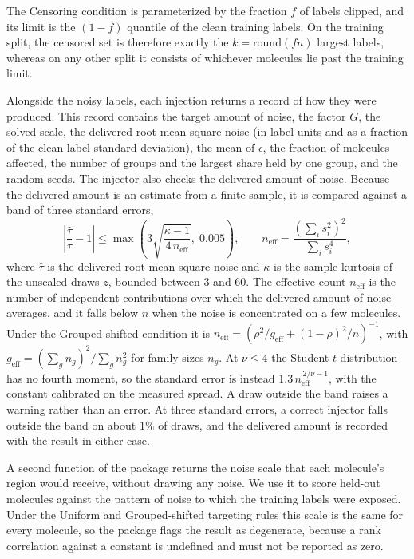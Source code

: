The Censoring condition is parameterized by the fraction $f$ of labels clipped, and its limit is the $(1-f)$ quantile
of the clean training labels. On the training split, the censored
set is therefore exactly the $k = \mathrm{round}(fn)$ largest labels, whereas on any other split it consists of whichever
molecules lie past the training limit.

Alongside the noisy labels, each injection returns a record of how they were produced. This record contains the target amount of noise, the factor
$G$, the solved scale, the delivered root-mean-square noise (in label units and as a fraction of the
clean label standard deviation), the mean of $\epsilon$, the fraction of molecules affected, the
number of groups and the largest share held by one group, and the random seeds. The injector also checks the delivered amount of noise.
Because the delivered amount is an estimate from a finite sample, it is compared against a band of three
standard errors,
\begin{equation}
\left|\frac{\hat{\tau}}{\tau} - 1\right| \le \max\!\left(3\sqrt{\frac{\kappa - 1}{4\,n_{\mathrm{eff}}}},\; 0.005\right),
\qquad
n_{\mathrm{eff}} = \frac{\left(\sum_i s_i^2\right)^2}{\sum_i s_i^4},
\label{eq:dose_tolerance}
\end{equation}
where $\hat{\tau}$ is the delivered root-mean-square noise and $\kappa$ is the sample kurtosis of the
unscaled draws $z$, bounded between 3 and 60. The effective count $n_{\mathrm{eff}}$ is the number of
independent contributions over which the delivered amount of noise averages, and it falls below $n$ when the noise is
concentrated on a few molecules. Under the Grouped-shifted condition it is
$n_{\mathrm{eff}} = \left(\rho^2/g_{\mathrm{eff}} + (1-\rho)^2/n\right)^{-1}$, with
$g_{\mathrm{eff}} = \left(\sum_g n_g\right)^2 / \sum_g n_g^2$ for family sizes $n_g$. At
$\nu \le 4$ the Student-$t$ distribution has no fourth moment, so the standard error is instead
$1.3\,n_{\mathrm{eff}}^{\,2/\nu - 1}$, with the constant calibrated on the measured spread. A draw
outside the band raises a warning rather than an error. At three standard errors, a correct injector
falls outside the band on about $1\%$ of draws, and the delivered amount is recorded with the result
in either case.

A second function of the package returns the noise scale that each molecule's region would receive, without drawing any noise.
We use it to score held-out molecules against the pattern of noise to which the training labels were exposed. Under the
Uniform and Grouped-shifted targeting rules this scale is the same for every molecule, so the package flags the result
as degenerate, because a rank correlation against a constant is undefined and must not be reported as zero.

